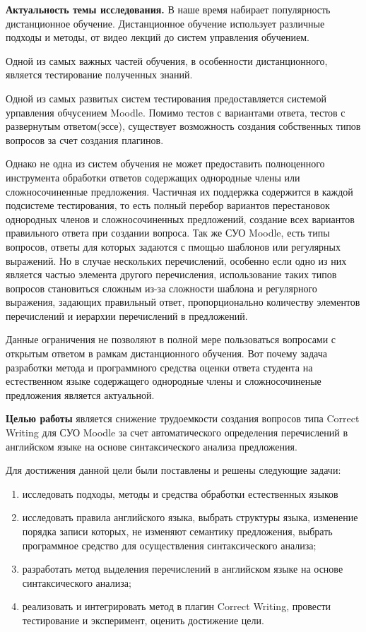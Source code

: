 \documentclass[a4paper]{G2-105}
\begin{document}
\VSTUInitializeAvtoreferat%
\par \textbf{Актуальность темы исследования.}
В наше время набирает популярность дистанционное обучение. Дистанционное обучение использует различные подходы и методы, от видео лекций до систем управления обучением.
\par Одной из самых важных частей обучения, в особенности дистанционного, является тестирование полученных знаний.
\par Одной из самых развитых систем тестирования предоставляется системой урпавления обчусением Moodle. Помимо тестов с вариантами
ответа, тестов с развернутым ответом(эссе), существует возможность создания собственных типов вопросов за счет создания плагинов.
\par Однако не одна из систем обучения не может предоставить полноценного инструмента обработки ответов содержащих однородные члены или сложносочиненные предложения.
Частичная их поддержка содержится в каждой подсистеме тестирования, то есть полный перебор вариантов перестановок однородных членов и сложносочиненных предложений, создание всех
вариантов правильного ответа при создании вопроса. Так же СУО Moodle, есть типы вопросов, ответы для которых задаются с пмощью шаблонов или регулярных выражений.
Но в случае нескольких перечислений, особенно если одно из них является частью элемента другого перечисления, использование таких типов
вопросов становиться сложным из-за сложности шаблона и регулярного выражения, задающих правильный ответ,
пропорционально количеству элементов перечислений и иерархии перечислений в предложений.
\par Данные ограничения не позволяют в полной мере пользоваться вопросами с открытым ответом в рамкам дистанционного обучения.
Вот почему задача разработки метода и программного средства оценки ответа студента на естественном языке содержащего однородные члены и сложносочиненые предложения является актуальной.
\par \textbf{Целью работы} является снижение трудоемкости создания вопросов типа Correct Writing для
СУО Moodle за счет автоматического определения перечислений в английском языке на основе синтаксического
анализа предложения.
\par Для достижения данной цели были поставлены и решены следующие задачи:
    \begin{enumerate}
        \item исследовать подходы, методы и средства обработки естественных языков
        \item исследовать правила английского языка, выбрать структуры языка, изменение порядка записи
            которых, не изменяют семантику предложения, выбрать программное средство для осуществления
            синтаксического анализа;
        \item разработать метод выделения перечислений в английском языке на основе синтаксического
            анализа;
        \item реализовать и интегрировать метод в плагин Correct Writing, провести тестирование и
            эксперимент, оценить достижение цели.
       \end{enumerate}
\end{document}
